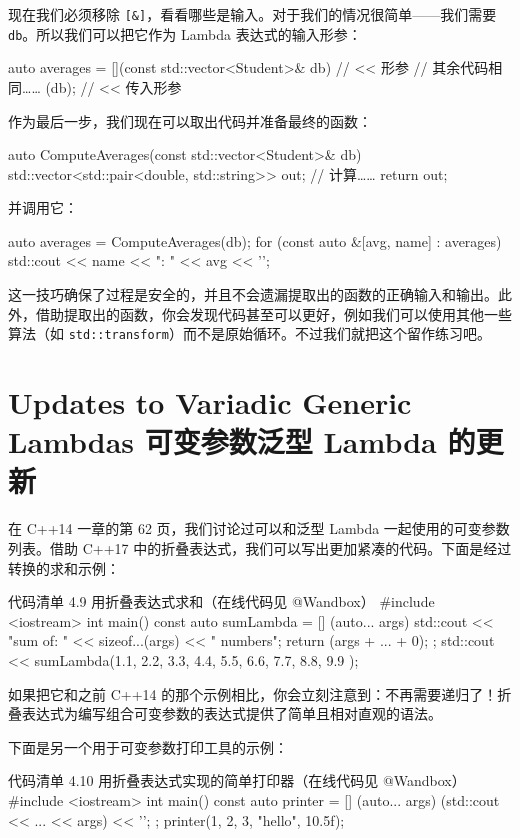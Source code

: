 现在我们必须移除 \texttt{[\&]}，看看哪些是输入。对于我们的情况很简单——我们需要 \texttt{db}。所以我们可以把它作为 Lambda 表达式的输入形参：

\begin{codebox}
auto averages = [](const std::vector<Student>& db) {
// << 形参
// 其余代码相同……
}(db); // << 传入形参
\end{codebox}

作为最后一步，我们现在可以取出代码并准备最终的函数：

\begin{codebox}
auto ComputeAverages(const std::vector<Student>& db) {
std::vector<std::pair<double, std::string>> out;
// 计算……
return out;
}
\end{codebox}

并调用它：

\begin{codebox}
auto averages = ComputeAverages(db);
for (const auto &[avg, name] : averages)
std::cout << name << ": " << avg << '\n';
\end{codebox}

这一技巧确保了过程是安全的，并且不会遗漏提取出的函数的正确输入和输出。此外，借助提取出的函数，你会发现代码甚至可以更好，例如我们可以使用其他一些算法（如 \texttt{std::transform}）而不是原始循环。不过我们就把这个留作练习吧。

\section{Updates to Variadic Generic Lambdas 可变参数泛型 Lambda 的更新}

在 C++14 一章的第 62 页，我们讨论过可以和泛型 Lambda 一起使用的可变参数列表。借助 C++17 中的折叠表达式，我们可以写出更加紧凑的代码。下面是经过转换的求和示例：

\begin{codeboxt}{代码清单 4.9 用折叠表达式求和（在线代码见 @Wandbox）}
#include <iostream>
int main() {
const auto sumLambda = [] (auto... args) {
std::cout << "sum of: " << sizeof...(args) << " numbers\n";
return (args + ... + 0);
};
std::cout << sumLambda(1.1, 2.2, 3.3, 4.4, 5.5, 6.6, 7.7, 8.8, 9.9 );
}
\end{codeboxt}

如果把它和之前 C++14 的那个示例相比，你会立刻注意到：不再需要递归了！折叠表达式为编写组合可变参数的表达式提供了简单且相对直观的语法。

下面是另一个用于可变参数打印工具的示例：

\begin{codeboxt}{代码清单 4.10 用折叠表达式实现的简单打印器（在线代码见 @Wandbox）}
#include <iostream>
int main() {
const auto printer = [] (auto... args) {
(std::cout << ... << args) << '\n';
};
printer(1, 2, 3, "hello", 10.5f);
}
\end{codeboxt}

